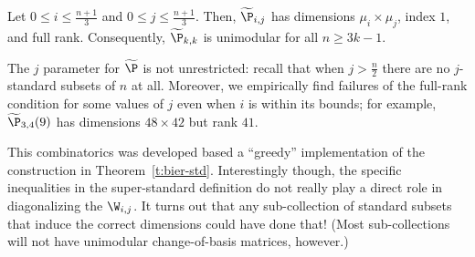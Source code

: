 \begin{conjecture}\label{c:sso}
Let $0 \leq i \leq \frac{n+1}{3}$ and $0 \leq j \leq \frac{n+1}{3}$.  Then, $\widetilde{\P}_{i,j}$ has dimensions $\mu_i \times \mu_j$, index $1$, and full rank.  Consequently, $\widetilde\P_{k,k}$ is unimodular for all $n \geq 3k - 1$.
\end{conjecture}

\begin{remark}
The $j$ parameter for $\widetilde\P$ is not unrestricted:  recall that when $j > \frac{n}{2}$ there are no $j$-standard subsets of $n$ at all.  Moreover, we empirically find failures of the full-rank condition for some values of $j$ even when $i$ is within its bounds; for example, $\widetilde\P_{3,4}(9)$ has dimensions $48 \times 42$ but rank $41$. 
\end{remark}

This combinatorics was developed based a ``greedy'' implementation of the construction in Theorem~\ref{t:bier-std}.  Interestingly though, the specific inequalities in the super-standard definition do not really play a direct role in diagonalizing the $\W_{i,j}$.  It turns out that any sub-collection of standard subsets that induce the correct dimensions could have done that!  (Most sub-collections will not have unimodular change-of-basis matrices, however.)

